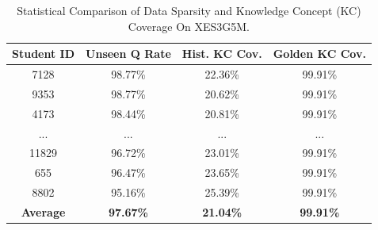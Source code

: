 \begin{table}[t]
    \centering
    \caption{Statistical Comparison of Data Sparsity and Knowledge Concept (KC) Coverage On XES3G5M.}
    \label{tab:golden_set_necessity}
    
    \small 
    
    \renewcommand{\arraystretch}{1.1}
    
    \begin{tabular}{cccc} 
        \toprule
        \textbf{Student ID} & \textbf{Unseen Q Rate} & \textbf{Hist. KC Cov.} & \textbf{Golden KC Cov.} \\
        \midrule
        7128  & 98.77\% & 22.36\% & 99.91\% \\
        9353  & 98.77\% & 20.62\% & 99.91\% \\
        4173  & 98.44\% & 20.81\% & 99.91\% \\
        ...   & ...     & ...     & ...     \\
        11829 & 96.72\% & 23.01\% & 99.91\% \\
        655   & 96.47\% & 23.65\% & 99.91\% \\
        8802  & 95.16\% & 25.39\% & 99.91\% \\
        \midrule
        \textbf{Average} & \textbf{97.67\%} & \textbf{21.04\%} & \textbf{99.91\%} \\
        \bottomrule
    \end{tabular}
\end{table}